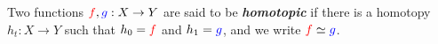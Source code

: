 \documentclass[preview]{standalone}
\begin{document}
\begin{center}
Two functions $\mathcolor{red}{f},\mathcolor{blue}{g} : X\to Y$ are said to be \textbf{\textit{homotopic}} if there is a homotopy $h_t : X\to Y$ such that $h_0=\mathcolor{red}{f}$ and $h_1=\mathcolor{blue}{g}$, and we write $\mathcolor{red}{f}\simeq \mathcolor{blue}{g}$.
\end{center}
\end{document}
